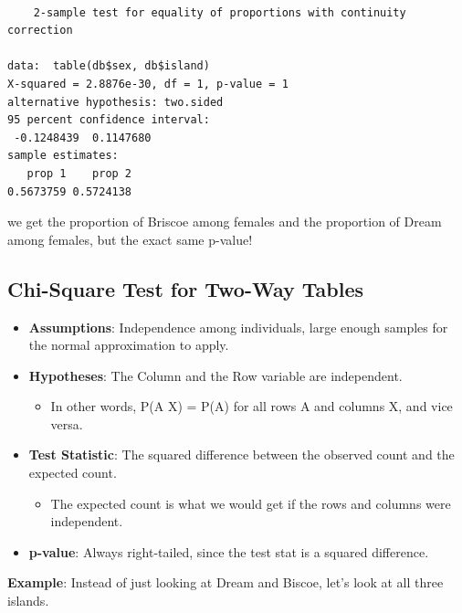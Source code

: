 \documentclass[
  letterpaper,
  DIV=11,
  numbers=noendperiod,
  oneside]{scrreprt}
\newenvironment{Shaded}{\begin{snugshade}}{\end{snugshade}}
\newcommand{\FunctionTok}[1]{\textcolor[rgb]{0.28,0.35,0.67}{#1}}
\newcommand{\NormalTok}[1]{\textcolor[rgb]{0.00,0.23,0.31}{#1}}
\newcommand{\SpecialCharTok}[1]{\textcolor[rgb]{0.37,0.37,0.37}{#1}}
\providecommand{\tightlist}{%
  \setlength{\itemsep}{0pt}\setlength{\parskip}{0pt}}\usepackage{longtable,booktabs,array}
\begin{document}
\begin{verbatim}

    2-sample test for equality of proportions with continuity correction

data:  table(db$sex, db$island)
X-squared = 2.8876e-30, df = 1, p-value = 1
alternative hypothesis: two.sided
95 percent confidence interval:
 -0.1248439  0.1147680
sample estimates:
   prop 1    prop 2 
0.5673759 0.5724138 
\end{verbatim}

we get the proportion of Briscoe among females and the proportion of
Dream among females, but the exact same p-value!

\hypertarget{chi-square-test-for-two-way-tables}{%
\subsection{Chi-Square Test for Two-Way
Tables}\label{chi-square-test-for-two-way-tables}}

\begin{itemize}
\tightlist
\item
  \textbf{Assumptions}: Independence among individuals, large enough
  samples for the normal approximation to apply.
\item
  \textbf{Hypotheses}: The Column and the Row variable are independent.

  \begin{itemize}
  \tightlist
  \item
    In other words, P(A \textbar{} X) = P(A) for all rows A and columns
    X, and vice versa.
  \end{itemize}
\item
  \textbf{Test Statistic}: The squared difference between the observed
  count and the expected count.

  \begin{itemize}
  \tightlist
  \item
    The expected count is what we would get if the rows and columns were
    independent.
  \end{itemize}
\item
  \textbf{p-value}: Always right-tailed, since the test stat is a
  squared difference.
\end{itemize}

\textbf{Example}: Instead of just looking at Dream and Biscoe, let's
look at all three islands.

\begin{Shaded}
\end{Shaded}
\end{document}
